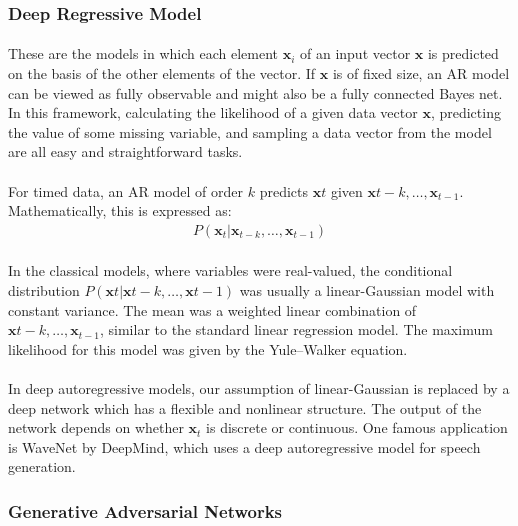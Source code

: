 \documentclass{article}
\begin{document}
    \subsubsection{Deep Regressive Model}
            \paragraph{}These are the models in which each element $\mathbf{x}_i$ of an input vector $\mathbf{x}$ is predicted on the basis of the other elements of the vector. If $\mathbf{x}$ is of fixed size, an AR model can be viewed as fully observable and might also be a fully connected Bayes net. In this framework, calculating the likelihood of a given data vector $\mathbf{x}$, predicting the value of some missing variable, and sampling a data vector from the model are all easy and straightforward tasks.
            \paragraph{} For timed data, an AR model of order $k$ predicts $\mathbf{x}t$ given $\mathbf{x}{t-k}, \dots, \mathbf{x}_{t-1}$. Mathematically, this is expressed as:
              \begin{align*}
                P(\mathbf{x}_t | \mathbf{x}_{t-k}, \dots, \mathbf{x}_{t-1})
              \end{align*}
            \paragraph{}  In the classical models, where variables were real-valued, the conditional distribution $P(\mathbf{x}t | \mathbf{x}{t-k}, \dots, \mathbf{x}{t-1})$ was usually a linear-Gaussian model with constant variance. The mean was a weighted linear combination of $\mathbf{x}{t-k}, \dots, \mathbf{x}_{t-1}$, similar to the standard linear regression model. The maximum likelihood for this model was given by the Yule–Walker equation.
            \paragraph{} In deep autoregressive models, our assumption of linear-Gaussian is replaced by a deep network which has a flexible and nonlinear structure. The output of the network depends on whether $\mathbf{x}_t$ is discrete or continuous. One famous application is WaveNet by DeepMind, which uses a deep autoregressive model for speech generation.

    \subsubsection{Generative Adversarial Networks}
\end{document}
